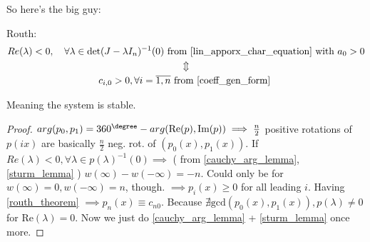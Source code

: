 So here's the big guy:

\begin{theorem}\label{routh_theorem}
Routh:
\begin{gather*}
	Re(\lambda) < 0, \quad \forall \lambda \in \det (J - \lambda
	I_n)^{-1}(0) \text{ from \ref{lin_apporx_char_equation} with } a_0 > 0 \\
	\Updownarrow  \\
	c_{i,0} > 0, \forall  i = \overline{1,n} \text{ from \ref{coeff_gen_form} }
\end{gather*}
\end{theorem}
Meaning the system is stable.

\begin{proof}

$arg(p_0,p_1) = 360^\degree - arg(\text{Re}(p),
\text{Im}(p)) \implies \frac{n}{2}$ positive rotations of $p(ix)$ are
basically $\frac{n}{2}$ neg. rot. of $(p_0(x), p_1(x))$. If
$Re(\lambda) < 0, \forall \lambda \in p(\lambda)^{-1}(0) \implies$ (
from  \ref{cauchy_arg_lemma}, \ref{sturm_lemma} ) $w(\infty) - w( -
\infty) = -n$. Could only be for $w(\infty) = 0, w(- \infty) = n$,
though. $ \implies p_i(x) \geq 0$ for all leading $i$. Having
\ref{routh_theorem} $\implies p_n(x) \equiv c_{n0}$. Because
$\nexists \text{gcd}(p_0(x),p_1(x)), p(\lambda) \neq 0$ for
Re$(\lambda) = 0$. Now we just do \ref{cauchy_arg_lemma} +
\ref{sturm_lemma} once more.
\end{proof}

